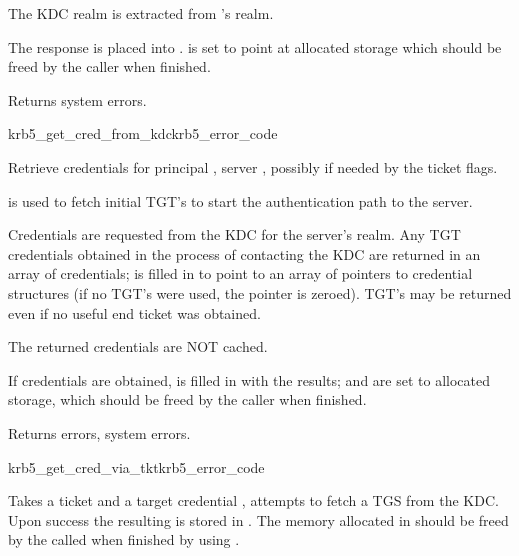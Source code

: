 The KDC realm is extracted from 's realm.

The response is placed into .
 is set to point at allocated storage
which should be freed by the caller when finished.

Returns system errors.

\begin{funcdecl}{krb5_get_cred_from_kdc}{krb5_error_code}{\funcinout}
\funcin
{}
\funcout			
{}
\end{funcdecl}


Retrieve credentials for principal ,
server , possibly
 if needed by the ticket flags.

 is used to fetch initial TGT's to start the authentication
path to the server.

Credentials are requested from the KDC for the server's realm.  Any
TGT credentials obtained in the process of contacting the KDC are
returned in an array of credentials;  is filled in to
point to an array of pointers to credential structures (if no TGT's were
used, the pointer is zeroed).  TGT's may be returned even if no useful
end ticket was obtained.

The returned credentials are NOT cached.

If credentials are obtained,  is filled in with the results;
 and
 are set to allocated storage,
which should be freed by the caller when finished.

Returns errors, system errors.

\begin{funcdecl}{krb5_get_cred_via_tkt}{krb5_error_code}{\funcinout}
\funcin
{}
\funcout
{}
\end{funcdecl}

Takes a ticket  and a target credential
, attempts to fetch a TGS from the KDC. Upon
success the resulting is stored in . The memory
allocated in  should be freed by the called when
finished by using . 

